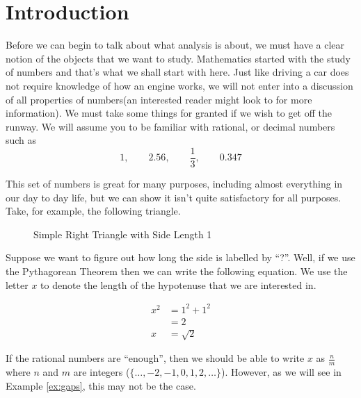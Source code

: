 
\section{Introduction}
Before we can begin to talk about what analysis is about, we must have a clear
notion of the objects that we want to study. Mathematics started with the study
of numbers and that's what we shall start with here. Just like driving a car
does not require knowledge of how an engine works, we will not enter into a
discussion of all properties of numbers(an interested reader might look to
 for more information). We
must take some things for granted if we wish to get off the runway. We will
assume you to be familiar with rational, or decimal numbers such as
\begin{equation}\label{eq:numbers}
1, \qquad 2.56, \qquad \frac{1}{3}, \qquad 0.347
\end{equation}

This set of numbers is great for many purposes, including almost everything in
our day to day life, but we can show it isn't quite satisfactory for all
purposes. Take, for example, the following triangle.

\begin{figure}\label{fig:right-triangle}
    \centering
    \caption{Simple Right Triangle with Side Length 1}
\end{figure}

Suppose we want to figure out how long the side is labelled by ``?''. Well, if
we use the Pythagorean Theorem then we can write the following
equation. We use the letter $x$ to denote the length of the hypotenuse that we
are interested in. 

\begin{align}
    x^2 & = 1^2 + 1^2 \\ \nonumber
    & = 2 \\ \nonumber
    x & = \sqrt{2} \label{eq:sqrt2}
\end{align}

If the rational numbers are ``enough'', then we should be able to write $x$
as $\frac{n}{m}$ where $n$ and $m$ are integers ({$\{\ldots, -2, -1,
0, 1, 2, \ldots\}$}).
However, as we will see in Example \ref{ex:gaps}, this may not be the case.

